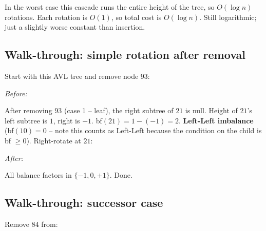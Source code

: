 \documentclass[11pt]{article}
\begin{document}
In the worst case this cascade runs the entire height of the tree, so $O(\log n)$ rotations. Each rotation is $O(1)$, so total cost is $O(\log n)$. Still logarithmic; just a slightly worse constant than insertion.

\subsection*{Walk-through: simple rotation after removal}

Start with this AVL tree and remove node $93$:

\begin{center}
\emph{Before:}
\end{center}

After removing $93$ (case 1 -- leaf), the right subtree of $21$ is null. Height of $21$'s left subtree is $1$, right is $-1$. bf$(21) = 1 - (-1) = 2$. \textbf{Left-Left imbalance} (bf$(10) = 0$ -- note this counts as Left-Left because the condition on the child is bf $\ge 0$). Right-rotate at $21$:

\begin{center}
\emph{After:}
\end{center}

All balance factors in $\{-1, 0, +1\}$. Done.

\subsection*{Walk-through: successor case}

Remove $84$ from:

\begin{center}
\end{center}
\end{document}
